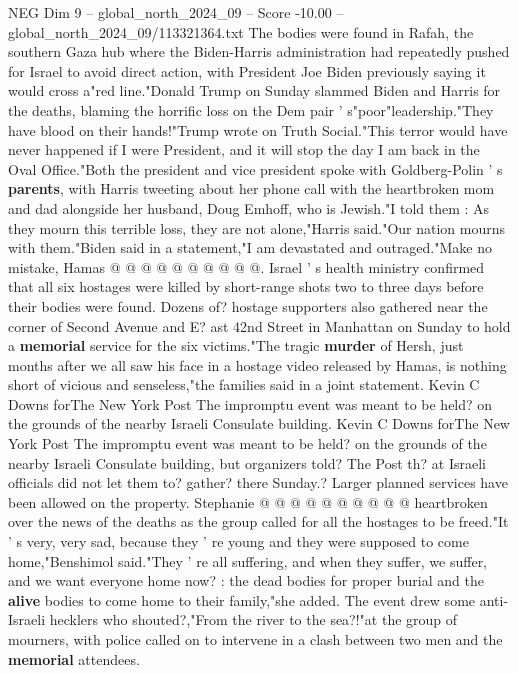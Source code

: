 \begin{textsample}{NEG Dim 9 – global\_north\_2024\_09 – Score -10.00 – global\_north\_2024\_09/113321364.txt}  \label{ex:f9_neg_015}
The bodies were found in Rafah, the southern Gaza hub where the Biden-Harris administration had repeatedly pushed for Israel to avoid direct action, with President Joe Biden previously saying it would cross a"red line."Donald Trump on Sunday slammed Biden and Harris for the deaths, blaming the horrific loss on the Dem pair ' s"poor"leadership."They have blood on their hands!"Trump wrote on Truth Social."This terror would have never happened if I were President, and it will stop the day I am back in the Oval Office."Both the president and vice president spoke with Goldberg-Polin ' s \textbf{parents}, with Harris tweeting about her phone call with the heartbroken mom and dad alongside her husband, Doug Emhoff, who is Jewish."I told them : As they mourn this terrible loss, they are not alone,"Harris said."Our nation mourns with them."Biden said in a statement,"I am devastated and outraged."Make no mistake, Hamas @ @ @ @ @ @ @ @ @ @.
Israel ' s health ministry confirmed that all six hostages were killed by short-range shots two to three days before their bodies were found.
Dozens of? hostage supporters also gathered near the corner of Second Avenue and E? ast 42nd Street in Manhattan on Sunday to hold a \textbf{memorial} service for the six victims."The tragic \textbf{murder} of Hersh, just months after we all saw his face in a hostage video released by Hamas, is nothing short of vicious and senseless,"the families said in a joint statement.
Kevin C Downs forThe New York Post The impromptu event was meant to be held? on the grounds of the nearby Israeli Consulate building.
Kevin C Downs forThe New York Post The impromptu event was meant to be held? on the grounds of the nearby Israeli Consulate building, but organizers told?
The Post th? at Israeli officials did not let them to? gather? there Sunday.?
Larger planned services have been allowed on the property.
Stephanie @ @ @ @ @ @ @ @ @ @ heartbroken over the news of the deaths as the group called for all the hostages to be freed."It ' s very, very sad, because they ' re young and they were supposed to come home,"Benshimol said."They ' re all suffering, and when they suffer, we suffer, and we want everyone home now? : the dead bodies for proper burial and the \textbf{alive} bodies to come home to their family,"she added.
The event drew some anti-Israeli hecklers who shouted?,"From the river to the sea?!"at the group of mourners, with police called on to intervene in a clash between two men and the \textbf{memorial} attendees.

\end{textsample}
